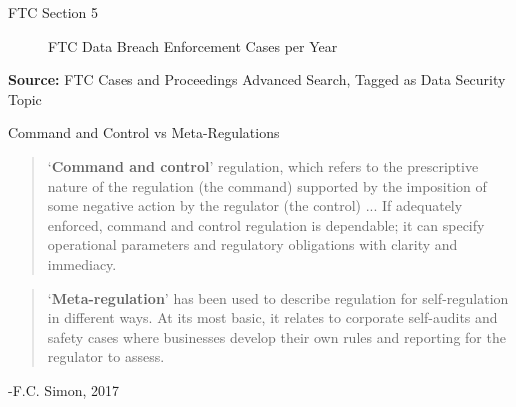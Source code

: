 \documentclass[10pt]{beamer}
\begin{document}
\begin{frame}{FTC Section 5}
\begin{figure}
      \caption{FTC Data Breach Enforcement Cases per Year} \label{fig:figure12}
\end{figure}
\textbf{Source:} FTC Cases and Proceedings Advanced Search, Tagged as Data Security Topic
\end{frame}

\begin{frame}{Command and Control vs Meta-Regulations}
\begin{quote}
`\textbf{Command and control}' regulation, which refers to the prescriptive nature of the regulation (the command) supported by the imposition of some negative action by the regulator (the control) ... If adequately enforced, command and control regulation is dependable; it can specify operational parameters and regulatory obligations with clarity and immediacy.
\end{quote}
\vspace{.15cm}
\begin{quote}
`\textbf{Meta-regulation}' has been used to describe regulation for self-regulation in different ways. At its most basic, it relates to corporate self-audits and safety cases where businesses develop their own rules and reporting for the regulator to assess.    
\end{quote}
 -F.C. Simon, 2017 \cite{SimonMetaregulationpracticenormative2016}
\end{frame}
\end{document}
